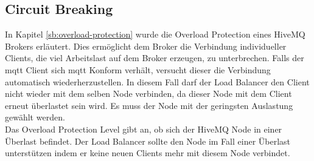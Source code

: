 \subsection{Circuit Breaking}
In Kapitel \ref{sb:overload-protection} wurde die Overload Protection eines HiveMQ Brokers erläutert. Dies ermöglicht dem Broker die Verbindung individueller Clients, die viel Arbeitslast auf dem Broker erzeugen, zu unterbrechen. Falls der \ac{mqtt} Client sich \ac{mqtt} Konform verhält, versucht dieser die Verbindung automatisch wiederherzustellen.
In diesem Fall darf der Load Balancer den Client nicht wieder mit dem selben Node verbinden, da dieser Node mit dem Client erneut überlastet sein wird. Es muss der Node mit der geringsten Auslastung gewählt werden.
\\
Das Overload Protection Level gibt an, ob sich der HiveMQ Node in einer Überlast befindet. Der Load Balancer sollte den Node im Fall einer Überlast unterstützen indem er keine neuen Clients mehr mit diesem Node verbindet.

